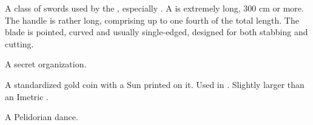 \begin{gloss}
\begin{comment}
\paragraph{\senaan}
\end{comment}
\gitem[\senaan]{\senaan}
A class of swords used by the \resphain, especially \CiriathSepher. 
A \senaan{} is extremely long, 300 cm or more. 
The handle is rather long, comprising up to one fourth of the total length. 
The blade is pointed, curved and usually single-edged, designed for both stabbing and cutting. 







\begin{comment}
\paragraph{Sentinels of \Miith}
\end{comment}
A secret organization. 







\begin{comment}
\paragraph{sun}
\end{comment}
A standardized gold coin with a Sun printed on it. 
Used in \Velcad{}. 
Slightly larger than an Imetric .







\begin{comment}
\paragraph{tacupien}
\end{comment}
A Pelidorian dance.







\begin{comment}

\end{comment}
\end{gloss}
